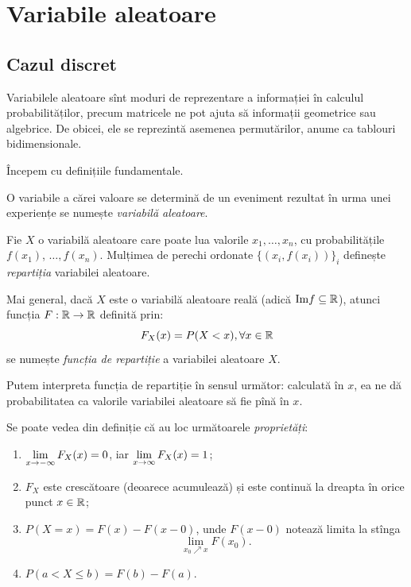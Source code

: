 
\chapter{Variabile aleatoare}

\section{Cazul discret}

\indent\indent Variabilele aleatoare sînt moduri de reprezentare a informației
în calculul probabilităților, precum matricele ne pot ajuta să 
informații geometrice sau algebrice. De obicei, ele se reprezintă asemenea
permutărilor, anume ca tablouri bidimensionale.

Începem cu definițiile fundamentale.

\begin{definition}\label{def:v-al}
  O variabile a cărei valoare se determină de un eveniment rezultat în urma
  unei experiențe se numește \emph{variabilă aleatoare}.
\end{definition}

\begin{definition}\label{def:repartitie}
  Fie $ X $ o variabilă aleatoare care poate lua valorile $ x_1, \dots, x_n $,
  cu probabilitățile $ f(x_1) $, $ \dots, f(x_n) $. Mulțimea de perechi ordonate
  $ \{ (x_i, f(x_i)) \}_i $ definește \emph{repartiția} variabilei aleatoare.

  Mai general, dacă $ X $ este o variabilă aleatoare reală (adică
  $ \mathrm{Im} f \subseteq \mathbb{R} $), atunci funcția $ F : \mathbb{R} \to \mathbb{R} $ definită prin:
  \[
    F_X(x) = P(X < x), \forall x \in \mathbb{R}
  \]
  se numește \emph{funcția de repartiție} a variabilei aleatoare $ X $.
\end{definition}

Putem interpreta funcția de repartiție în sensul următor: calculată în $ x $, ea
ne dă probabilitatea ca valorile variabilei aleatoare să fie pînă în $ x $.

Se poate vedea din definiție că au loc următoarele \emph{proprietăți}:
\begin{enumerate}[(1)]
\item $ \displaystyle\lim_{x \to -\infty} F_X(x) = 0 $, iar $ \displaystyle\lim_{x \to \infty} F_X(x) = 1 $;
\item $ F_X $ este crescătoare (deoarece acumulează) și este continuă la dreapta în
  orice punct $ x \in \mathbb{R} $;
\item $ P(X = x) = F(x) - F(x - 0) $, unde $ F(x - 0) $ notează limita la stînga
  \[
    \lim_{x_0 \nearrow x} F(x_0).
  \]
\item $ P(a < X \leq b) = F(b) - F(a) $.
\end{enumerate}

